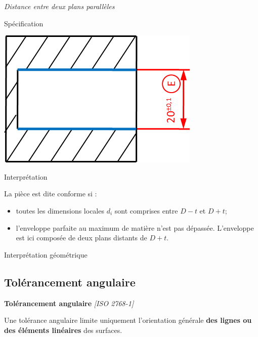 \documentclass[11pt,oneside]{article}
\begin{document}
\begin{exemple}
\textit{Distance entre deux plans parallèles}

\begin{minipage}[t]{.3\linewidth}
\begin{center}
Spécification

\includegraphics[width=.95\textwidth]{png/linE_plan}
\end{center}
\end{minipage} \hfill
\begin{minipage}[t]{.3\linewidth}
\begin{center}
Interprétation
\end{center}
La pièce est dite conforme si :
\begin{itemize}
\item toutes les dimensions locales $d_i$ sont comprises entre $D-t$ et $D+t$;
\item l'enveloppe parfaite au maximum de matière n'est pas dépassée. L'enveloppe est ici composée de deux plans distants de $D+t$.
\end{itemize}

\end{minipage} \hfill
\begin{minipage}[t]{.3\linewidth}
\begin{center}
Interprétation géométrique

\end{center}
\end{minipage}

\end{exemple}


\subsection{Tolérancement angulaire}
\begin{resultat}
\textbf{Tolérancement angulaire} \textit{[ISO 2768-1]}

Une tolérance angulaire limite uniquement l'orientation générale \textbf{des lignes ou des éléments linéaires} des surfaces. 

\end{resultat}
\end{document}
